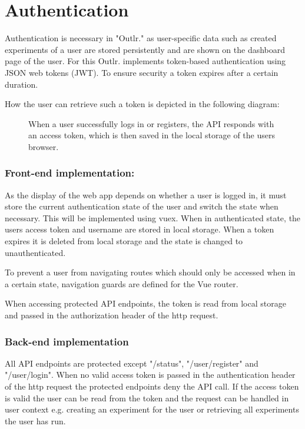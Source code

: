 \section{Authentication}
\label{sec:authentication}
Authentication is necessary in "Outlr." as user-specific data such as created experiments of a user are stored persistently and are shown on the dashboard page of the user. For this Outlr. implements token-based authentication using JSON web tokens (JWT). 
To ensure security a token expires after a certain duration.

How the user can retrieve such a token is depicted in the following diagram:
\begin{figure}[!ht]
    \centering
    
    \caption{When a user successfully logs in or registers, the API responds with an access token, which is then saved in the local storage of the users browser.}
    \label{fig:getting-access-token}
\end{figure}

\subsubsection*{Front-end implementation:}
As the display of the web app depends on whether a user is logged in, it must store the current authentication state of the user and switch the state when necessary. This will be implemented using vuex. When in authenticated state, the users access token and username are stored in local storage. When a token expires it is deleted from local storage and the state is changed to unauthenticated.

To prevent a user from navigating routes which should only be accessed when in a certain state, navigation guards are defined for the Vue router.

When accessing protected API endpoints, the token is read from local storage and passed in the authorization header of the http request.  
\subsubsection*{Back-end implementation}
All API endpoints are protected except "/status", "/user/register" and "/user/login".
When no valid access token is passed in the authentication header of the http request the protected endpoints deny the API call.
If the access token is valid the user can be read from the token and the request can be handled in user context e.g. creating an experiment for the user or retrieving all experiments the user has run.